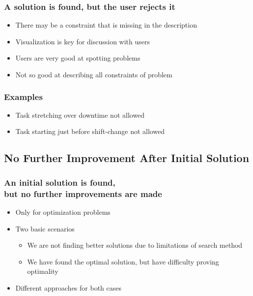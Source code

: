 \begin{frame}
\frametitle{A solution is found, but the user rejects it}
\begin{itemize}
\item There may be a constraint that is missing in the description
\item Visualization is key for discussion with users
\item Users are very good at spotting problems
\item Not so good at describing all constraints of problem 
\end{itemize}
\end{frame}

\begin{frame}
  \frametitle{Examples}
  \begin{itemize}
  \item Task stretching over downtime not allowed
  \item Task starting just before shift-change not allowed
  \end{itemize}
\end{frame}

\subsection{No Further Improvement After Initial Solution}

\begin{frame}
  \frametitle{An initial solution is found,\\ but no further improvements are made}
  \begin{itemize}
  \item Only for optimization problems
  \item Two basic scenarios
  \begin{itemize}
      \item We are not finding better solutions due to limitations of search method
      \item We have found the optimal solution, but have difficulty proving optimality
  \end{itemize}
  \item Different approaches for both cases
  \end{itemize}
  \end{frame}
  
